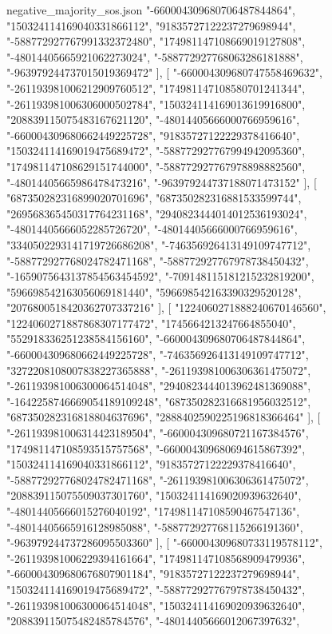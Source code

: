 \begin{filecontents*}[overwrite]{negative_majority_sos.json}
    "-660004309680706487844864",
    "150324114169040331866112",
    "91835727122237279698944",
    "-588772927767991332372480",
    "174981147108669019127808",
    "-48014405665921062273024",
    "-588772927768063286181888",
    "-963979244737015019369472"
   ],
   [
    "-660004309680747558469632",
    "-261193981006212909760512",
    "174981147108580701241344",
    "-261193981006306000502784",
    "150324114169013619916800",
    "208839115075483167621120",
    "-48014405666000766959616",
    "-660004309680662449225728",
    "91835727122229378416640",
    "150324114169019475689472",
    "-588772927767994942095360",
    "174981147108629151744000",
    "-588772927767978898882560",
    "-48014405665986478473216",
    "-963979244737188071473152"
   ],
   [
    "687350282316899020701696",
    "687350282316881533599744",
    "269568365450317764231168",
    "2940823444014012536193024",
    "-48014405666052285726720",
    "-48014405666000766959616",
    "3340502293141719726686208",
    "-746356926413149109747712",
    "-588772927768024782471168",
    "-588772927767978738450432",
    "-1659075643137854563454592",
    "-709148115181215232819200",
    "596698542163056069181440",
    "596698542163390329520128",
    "2076800518420362707337216"
   ],
   [
    "1224060271888240670146560",
    "1224060271887868307177472",
    "1745664213247664855040",
    "552918336251238584156160",
    "-660004309680706487844864",
    "-660004309680662449225728",
    "-746356926413149109747712",
    "3272208108007838227365888",
    "-261193981006306361475072",
    "-261193981006300064514048",
    "2940823444013962481369088",
    "-1642258746669054189109248",
    "687350282316681956032512",
    "687350282316818804637696",
    "2888402590225196818366464"
   ],
   [
    "-261193981006314423189504",
    "-660004309680721167384576",
    "174981147108593515757568",
    "-660004309680694615867392",
    "150324114169040331866112",
    "91835727122229378416640",
    "-588772927768024782471168",
    "-261193981006306361475072",
    "208839115075509037301760",
    "150324114169020939632640",
    "-48014405666015276040192",
    "174981147108590467547136",
    "-48014405665916128985088",
    "-588772927768115266191360",
    "-963979244737286095503360"
   ],
   [
    "-660004309680733119578112",
    "-261193981006229394161664",
    "174981147108568909479936",
    "-660004309680676807901184",
    "91835727122237279698944",
    "150324114169019475689472",
    "-588772927767978738450432",
    "-261193981006300064514048",
    "150324114169020939632640",
    "208839115075482485784576",
    "-48014405666012067397632",

\end{filecontents*}
